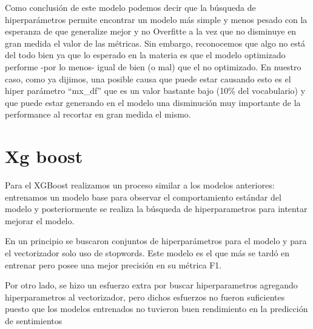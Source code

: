 \documentclass{article}
\begin{document}
Como conclusión de este modelo podemos decir que la búsqueda de hiperparámetros permite encontrar un modelo más simple y menos pesado con la esperanza de que generalize mejor y no Overfitte a la vez que no disminuye en gran medida el valor de las métricas. 
Sin embargo, reconocemos que algo no está del todo bien ya que lo esperado en la materia es que el modelo optimizado performe -por lo menos- igual de bien (o mal) que el no optimizado. En nuestro caso, como ya dijimos, una posible causa que puede estar causando esto es el hiper parámetro “mx\_df”  que es un valor bastante bajo (10\% del vocabulario) y que puede estar generando en el modelo una disminución muy importante de la performance al recortar en gran medida el mismo.


\section*{Xg boost}

Para el XGBoost realizamos un proceso similar a los modelos anteriores: entrenamos un modelo base para observar el comportamiento estándar del modelo y posteriormente se realiza la búsqueda de hiperparametros para intentar mejorar el modelo. 

En un principio se buscaron conjuntos de hiperparámetros para el modelo y para el vectorizador solo uso de stopwords. Este modelo es el que más se tardó en entrenar pero posee una mejor precisión en su métrica F1. 

Por otro lado, se hizo un esfuerzo extra por buscar hiperparametros agregando hiperparametros al vectorizador, pero dichos esfuerzos no fueron suficientes puesto que los modelos entrenados no tuvieron buen rendimiento en la predicción de sentimientos
\end{document}
